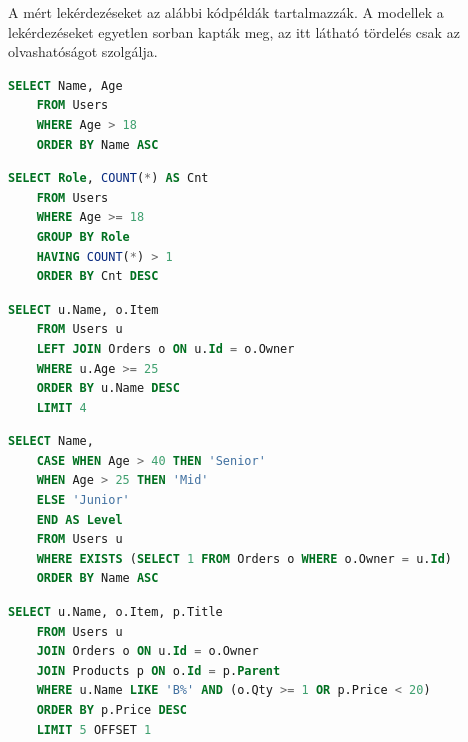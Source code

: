 A mért lekérdezéseket az alábbi kódpéldák tartalmazzák. A modellek a lekérdezéseket egyetlen sorban kapták meg, az itt látható tördelés csak az olvashatóságot szolgálja.

\begin{lstlisting}[language=SQL, caption={Q1, egyszerű szűrés és rendezés}, label={lst:llm_q1}]
	SELECT Name, Age
	FROM Users
	WHERE Age > 18
	ORDER BY Name ASC
\end{lstlisting}

\newpage

\begin{lstlisting}[language=SQL, deletekeywords={ROLE}, caption={Q2, csoportosítás, HAVING feltétel és rendezés az aggregátum aliasára}, label={lst:llm_q2}]
	SELECT Role, COUNT(*) AS Cnt
	FROM Users
	WHERE Age >= 18
	GROUP BY Role
	HAVING COUNT(*) > 1
	ORDER BY Cnt DESC
\end{lstlisting}

\begin{lstlisting}[language=SQL, caption={Q3, kéttáblás LEFT JOIN szűréssel, rendezéssel és lapozással}, label={lst:llm_q3}]
	SELECT u.Name, o.Item
	FROM Users u
	LEFT JOIN Orders o ON u.Id = o.Owner
	WHERE u.Age >= 25
	ORDER BY u.Name DESC
	LIMIT 4
\end{lstlisting}

\begin{lstlisting}[language=SQL, caption={Q4, CASE WHEN kifejezés és korrelált EXISTS allekérdezés}, label={lst:llm_q4}]
	SELECT Name,
	CASE WHEN Age > 40 THEN 'Senior'
	WHEN Age > 25 THEN 'Mid'
	ELSE 'Junior'
	END AS Level
	FROM Users u
	WHERE EXISTS (SELECT 1 FROM Orders o WHERE o.Owner = u.Id)
	ORDER BY Name ASC
\end{lstlisting}

\begin{lstlisting}[language=SQL, caption={Q5, háromtáblás JOIN összetett feltétellel, LIKE mintával, LIMIT és OFFSET záradékkal}, label={lst:llm_q5}]
	SELECT u.Name, o.Item, p.Title
	FROM Users u
	JOIN Orders o ON u.Id = o.Owner
	JOIN Products p ON o.Id = p.Parent
	WHERE u.Name LIKE 'B%' AND (o.Qty >= 1 OR p.Price < 20)
	ORDER BY p.Price DESC
	LIMIT 5 OFFSET 1
\end{lstlisting}
